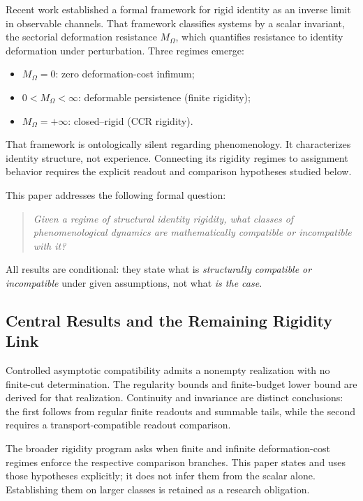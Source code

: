 \documentclass[11pt,a4paper]{article}
\theoremstyle{plain}
\theoremstyle{definition}
\theoremstyle{remark}
\begin{document}
Recent work \cite{paper1} established a formal framework for rigid identity as an inverse limit in observable channels. That framework classifies systems by a scalar invariant, the sectorial deformation resistance $M_\Omega$, which quantifies resistance to identity deformation under perturbation. Three regimes emerge:
\begin{itemize}[leftmargin=*]
    \item $M_\Omega = 0$: zero deformation-cost infimum;
    \item $0 < M_\Omega < \infty$: deformable persistence (finite rigidity);
    \item $M_\Omega = +\infty$: closed--rigid (CCR rigidity).
\end{itemize}

That framework is ontologically silent regarding phenomenology. It characterizes identity structure, not experience. Connecting its rigidity regimes to assignment behavior requires the explicit readout and comparison hypotheses studied below.

This paper addresses the following formal question:

\begin{quote}
\textit{Given a regime of structural identity rigidity, what classes of phenomenological dynamics are mathematically compatible or incompatible with it?}
\end{quote}

All results are conditional: they state what is \textit{structurally compatible or incompatible} under given assumptions, not what \textit{is the case}.

\subsection{Central Results and the Remaining Rigidity Link}
Controlled asymptotic compatibility admits a nonempty realization with no finite-cut determination. The regularity bounds and finite-budget lower bound are derived for that realization. Continuity and invariance are distinct conclusions: the first follows from regular finite readouts and summable tails, while the second requires a transport-compatible readout comparison.

The broader rigidity program asks when finite and infinite deformation-cost regimes enforce the respective comparison branches. This paper states and uses those hypotheses explicitly; it does not infer them from the scalar alone. Establishing them on larger classes is retained as a research obligation.
\end{document}
